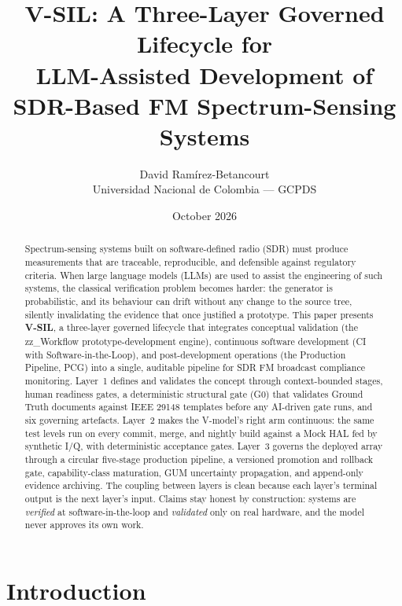 \documentclass[11pt,a4paper]{article}
\title{\textbf{V-SIL}: A Three-Layer Governed Lifecycle for\\[4pt]
LLM-Assisted Development of SDR-Based FM Spectrum-Sensing Systems}
\author{David Ramírez-Betancourt \\
Universidad Nacional de Colombia --- GCPDS}
\date{October 2026}
\begin{document}
\maketitle
\thispagestyle{empty}

\begin{abstract}
\noindent
Spectrum-sensing systems built on software-defined radio (SDR) must produce measurements that are
traceable, reproducible, and defensible against regulatory criteria. When large language models
(LLMs) are used to assist the engineering of such systems, the classical verification problem
becomes harder: the generator is probabilistic, and its behaviour can drift without any change to
the source tree, silently invalidating the evidence that once justified a prototype. This paper
presents \textbf{V-SIL}, a three-layer governed lifecycle that integrates conceptual validation
(the zz\_Workflow prototype-development engine), continuous software development
(CI with Software-in-the-Loop), and post-development operations (the Production Pipeline, PCG)
into a single, auditable pipeline for SDR FM broadcast compliance monitoring. Layer~1 defines and
validates the concept through context-bounded stages, human readiness gates, a deterministic
structural gate (G0) that validates Ground Truth documents against IEEE 29148 templates before
any AI-driven gate runs, and six governing artefacts. Layer~2 makes the V-model's right arm continuous: the same test levels run on every
commit, merge, and nightly build against a Mock HAL fed by synthetic I/Q, with deterministic
acceptance gates. Layer~3 governs the deployed array through a circular five-stage production
pipeline, a versioned promotion and rollback gate, capability-class maturation, GUM uncertainty
propagation, and append-only evidence archiving. The coupling between layers is clean because
each layer's terminal output is the next layer's input. Claims stay honest by construction:
systems are \emph{verified} at software-in-the-loop and \emph{validated} only on real hardware,
and the model never approves its own work.
\end{abstract}

\tableofcontents
\newpage

\section{Introduction}
\label{sec:intro}
\end{document}
